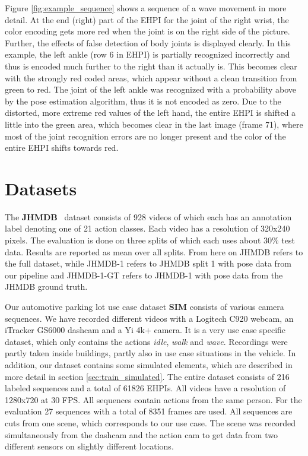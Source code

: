 \documentclass[a4paper, 10pt, conference]{ieeeconf}
\begin{document}
\begin{minipage}{\textwidth}
Figure \ref{fig:example_sequence} shows a sequence of a wave movement in more detail. At the end (right) part of the EHPI for the joint of the right wrist, the color encoding gets more red when the joint is on the right side of the picture. Further, the effects of false detection of body joints is displayed clearly. In this example, the left ankle (row 6 in EHPI) is partially recognized incorrectly and thus is encoded much further to the right than it actually is. This becomes clear with the strongly red coded areas, which appear without a clean transition from green to red. The joint of the left ankle was recognized with a probability above  by the pose estimation algorithm, thus it is not encoded as zero. Due to the distorted, more extreme red values of the left hand, the entire EHPI is shifted a little into the green area, which becomes clear in the last image (frame 71), where most of the joint recognition errors are no longer present and the color of the entire EHPI shifts towards red.


\section{Datasets}
\label{sec:datasets}
The \textbf{JHMDB}~\cite{jhuangUnderstandingActionRecognition2013} dataset consists of 928 videos of which each has an annotation label denoting one of 21 action classes. Each video has a resolution of 320x240 pixels. The evaluation is done on three splits of which each uses about 30\% test data. Results are reported as mean over all splits. From here on JHMDB refers to the full dataset, while JHMDB-1 refers to JHMDB split 1 with pose data from our pipeline and JHMDB-1-GT refers to JHMDB-1 with pose data from the JHMDB ground truth.

Our automotive parking lot use case dataset \textbf{SIM} consists of various camera sequences. We have recorded different videos with a Logitech C920 webcam, an iTracker GS6000 dashcam and a Yi 4k+ camera. It is a very use case specific dataset, which only contains the actions \textit{idle}, \textit{walk} and \textit{wave}. Recordings were partly taken inside buildings, partly also in use case situations in the vehicle. In addition, our dataset contains some simulated elements, which are described in more detail in section \ref{sec:train_simulated}. The entire dataset consists of 216 labeled sequences and a total of 61826 EHPIs. All videos have a resolution of 1280x720 at 30 FPS. All sequences contain actions from the same person. For the evaluation 27 sequences with a total of 8351 frames are used. All sequences are cuts from one scene, which corresponds to our use case. The scene was recorded simultaneously from the dashcam and the action cam to get data from two different sensors on slightly different locations.


\end{minipage}
\end{document}

